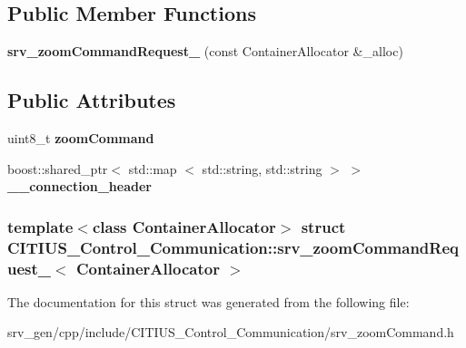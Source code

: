 \subsection*{\-Public \-Member \-Functions}
\begin{DoxyCompactItemize}
\item 
\hypertarget{struct_c_i_t_i_u_s___control___communication_1_1srv__zoom_command_request___a6bfd41a1009b44d76a0baab4f5ecd544}{{\bfseries srv\-\_\-zoom\-Command\-Request\-\_\-} (const \-Container\-Allocator \&\-\_\-alloc)}\label{struct_c_i_t_i_u_s___control___communication_1_1srv__zoom_command_request___a6bfd41a1009b44d76a0baab4f5ecd544}

\end{DoxyCompactItemize}
\subsection*{\-Public \-Attributes}
\begin{DoxyCompactItemize}
\item 
\hypertarget{struct_c_i_t_i_u_s___control___communication_1_1srv__zoom_command_request___a8d67df6350402c539cd96557f7ce454a}{uint8\-\_\-t {\bfseries zoom\-Command}}\label{struct_c_i_t_i_u_s___control___communication_1_1srv__zoom_command_request___a8d67df6350402c539cd96557f7ce454a}

\item 
\hypertarget{struct_c_i_t_i_u_s___control___communication_1_1srv__zoom_command_request___a47ff0e91642342451ee6ffd55b2542b0}{boost\-::shared\-\_\-ptr$<$ std\-::map\*
$<$ std\-::string, std\-::string $>$ $>$ {\bfseries \-\_\-\-\_\-connection\-\_\-header}}\label{struct_c_i_t_i_u_s___control___communication_1_1srv__zoom_command_request___a47ff0e91642342451ee6ffd55b2542b0}

\end{DoxyCompactItemize}
\subsubsection*{template$<$class Container\-Allocator$>$ struct C\-I\-T\-I\-U\-S\-\_\-\-Control\-\_\-\-Communication\-::srv\-\_\-zoom\-Command\-Request\-\_\-$<$ Container\-Allocator $>$}



\-The documentation for this struct was generated from the following file\-:\begin{DoxyCompactItemize}
\item 
srv\-\_\-gen/cpp/include/\-C\-I\-T\-I\-U\-S\-\_\-\-Control\-\_\-\-Communication/srv\-\_\-zoom\-Command.\-h\end{DoxyCompactItemize}
